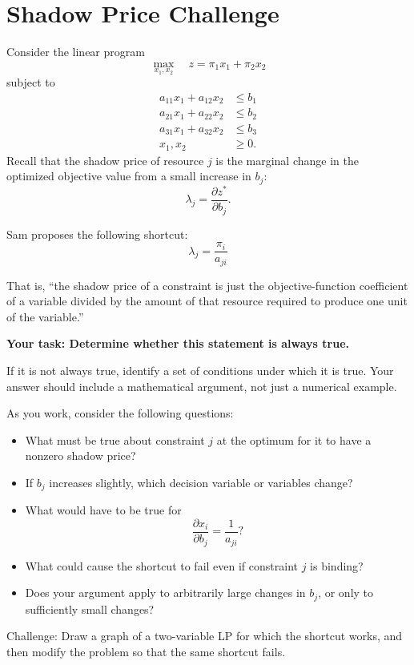 \documentclass[11pt]{article}
\begin{document}
\onehalfspacing

\section*{Shadow Price Challenge}

Consider the linear program
\[
\max_{x_1,x_2}\quad z=\pi_1x_1+\pi_2x_2
\]
subject to
\[
\begin{aligned}
a_{11}x_1+a_{12}x_2 &\le b_1\\
a_{21}x_1+a_{22}x_2 &\le b_2\\
a_{31}x_1+a_{32}x_2 &\le b_3\\
x_1,x_2&\ge 0.
\end{aligned}
\]Recall that the shadow price of resource \(j\) is the marginal change in the optimized objective value from a small increase in \(b_j\):
\[
\lambda_j=\frac{\partial z^*}{\partial b_j}.
\]

Sam proposes the following shortcut:
\[
\boxed{\lambda_j=\frac{\pi_i}{a_{ji}}}
\]

That is, “the shadow price of a constraint is just the objective-function coefficient of a variable divided by the amount of that resource required to produce one unit of the variable.”



\textbf{Your task: Determine whether this statement is always true.}


If it is not always true, identify a set of conditions under which it is true. Your answer should include a mathematical argument, not just a numerical example.

As you work, consider the following questions:
\begin{itemize}
\item What must be true about constraint \(j\) at the optimum for it to have a nonzero shadow price?
\item If \(b_j\) increases slightly, which decision variable or variables change?
\item What would have to be true for
\[
  \frac{\partial x_i}{\partial b_j}=\frac{1}{a_{ji}}?
  \]
\item What could cause the shortcut to fail even if constraint \(j\) is binding?
\item Does your argument apply to arbitrarily large changes in \(b_j\), or only to sufficiently small changes?
\end{itemize}
Challenge: Draw a graph of a two-variable LP for which the shortcut works, and then modify the problem so that the same shortcut fails.
\end{document}
